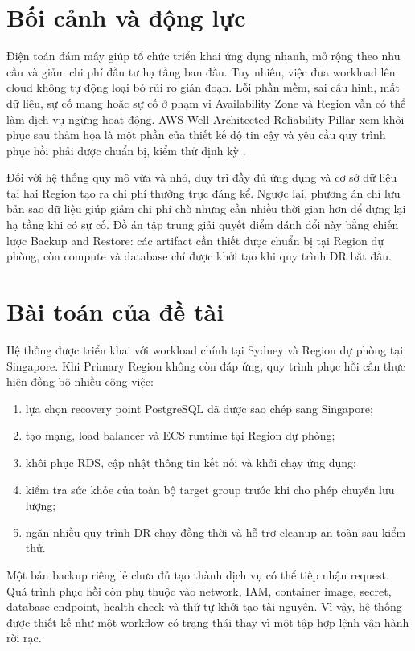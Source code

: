 \section{Bối cảnh và động lực}

Điện toán đám mây giúp tổ chức triển khai ứng dụng nhanh, mở rộng theo nhu cầu và giảm chi phí đầu tư hạ tầng ban đầu. Tuy nhiên, việc đưa workload lên cloud không tự động loại bỏ rủi ro gián đoạn. Lỗi phần mềm, sai cấu hình, mất dữ liệu, sự cố mạng hoặc sự cố ở phạm vi Availability Zone và Region vẫn có thể làm dịch vụ ngừng hoạt động. AWS Well-Architected Reliability Pillar xem khôi phục sau thảm họa là một phần của thiết kế độ tin cậy và yêu cầu quy trình phục hồi phải được chuẩn bị, kiểm thử định kỳ \cite{aws-dr-objectives}.

Đối với hệ thống quy mô vừa và nhỏ, duy trì đầy đủ ứng dụng và cơ sở dữ liệu tại hai Region tạo ra chi phí thường trực đáng kể. Ngược lại, phương án chỉ lưu bản sao dữ liệu giúp giảm chi phí chờ nhưng cần nhiều thời gian hơn để dựng lại hạ tầng khi có sự cố. Đồ án tập trung giải quyết điểm đánh đổi này bằng chiến lược Backup and Restore: các artifact cần thiết được chuẩn bị tại Region dự phòng, còn compute và database chỉ được khởi tạo khi quy trình DR bắt đầu.

\section{Bài toán của đề tài}

Hệ thống được triển khai với workload chính tại Sydney và Region dự phòng tại Singapore. Khi Primary Region không còn đáp ứng, quy trình phục hồi cần thực hiện đồng bộ nhiều công việc:

\begin{enumerate}
  \item lựa chọn recovery point PostgreSQL đã được sao chép sang Singapore;
  \item tạo mạng, load balancer và ECS runtime tại Region dự phòng;
  \item khôi phục RDS, cập nhật thông tin kết nối và khởi chạy ứng dụng;
  \item kiểm tra sức khỏe của toàn bộ target group trước khi cho phép chuyển lưu lượng;
  \item ngăn nhiều quy trình DR chạy đồng thời và hỗ trợ cleanup an toàn sau kiểm thử.
\end{enumerate}

Một bản backup riêng lẻ chưa đủ tạo thành dịch vụ có thể tiếp nhận request. Quá trình phục hồi còn phụ thuộc vào network, IAM, container image, secret, database endpoint, health check và thứ tự khởi tạo tài nguyên. Vì vậy, hệ thống được thiết kế như một workflow có trạng thái thay vì một tập hợp lệnh vận hành rời rạc.

